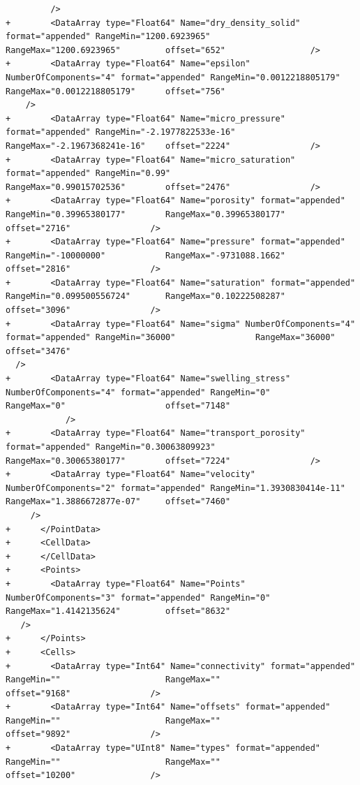 \documentclass[10pt]{article}
\begin{document}
\begin{lstlisting}
         />
+        <DataArray type="Float64" Name="dry_density_solid" format="appended" RangeMin="1200.6923965"         RangeMax="1200.6923965"         offset="652"                 />
+        <DataArray type="Float64" Name="epsilon" NumberOfComponents="4" format="appended" RangeMin="0.0012218805179"      RangeMax="0.0012218805179"      offset="756"             
    />
+        <DataArray type="Float64" Name="micro_pressure" format="appended" RangeMin="-2.1977822533e-16"    RangeMax="-2.1967368241e-16"    offset="2224"                />
+        <DataArray type="Float64" Name="micro_saturation" format="appended" RangeMin="0.99"                 RangeMax="0.99015702536"        offset="2476"                />
+        <DataArray type="Float64" Name="porosity" format="appended" RangeMin="0.39965380177"        RangeMax="0.39965380177"        offset="2716"                />
+        <DataArray type="Float64" Name="pressure" format="appended" RangeMin="-10000000"            RangeMax="-9731088.1662"        offset="2816"                />
+        <DataArray type="Float64" Name="saturation" format="appended" RangeMin="0.099500556724"       RangeMax="0.10222508287"        offset="3096"                />
+        <DataArray type="Float64" Name="sigma" NumberOfComponents="4" format="appended" RangeMin="36000"                RangeMax="36000"                offset="3476"              
  />
+        <DataArray type="Float64" Name="swelling_stress" NumberOfComponents="4" format="appended" RangeMin="0"                    RangeMax="0"                    offset="7148"    
            />
+        <DataArray type="Float64" Name="transport_porosity" format="appended" RangeMin="0.30063809923"        RangeMax="0.30065380177"        offset="7224"                />
+        <DataArray type="Float64" Name="velocity" NumberOfComponents="2" format="appended" RangeMin="1.3930830414e-11"     RangeMax="1.3886672877e-07"     offset="7460"           
     />
+      </PointData>
+      <CellData>
+      </CellData>
+      <Points>
+        <DataArray type="Float64" Name="Points" NumberOfComponents="3" format="appended" RangeMin="0"                    RangeMax="1.4142135624"         offset="8632"             
   />
+      </Points>
+      <Cells>
+        <DataArray type="Int64" Name="connectivity" format="appended" RangeMin=""                     RangeMax=""                     offset="9168"                />
+        <DataArray type="Int64" Name="offsets" format="appended" RangeMin=""                     RangeMax=""                     offset="9892"                />
+        <DataArray type="UInt8" Name="types" format="appended" RangeMin=""                     RangeMax=""                     offset="10200"               />

\end{lstlisting}
\end{document}
